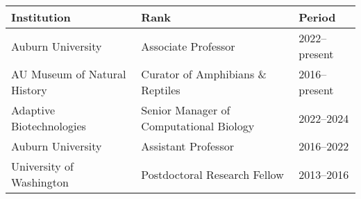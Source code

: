 \noindent\begin{tabulary}{\textwidth}{ @{} l l l @{} }
    \textbf{Institution} & \textbf{Rank} & \textbf{Period} \\
    \hline
    Auburn University & Associate Professor & 2022--present \\
    AU Museum of Natural History & Curator of Amphibians \& Reptiles & 2016--present \\
    Adaptive Biotechnologies & Senior Manager of Computational Biology & 2022--2024 \\
    Auburn University & Assistant Professor & 2016--2022 \\
    University of Washington & Postdoctoral Research Fellow & 2013--2016 \\
\end{tabulary}

